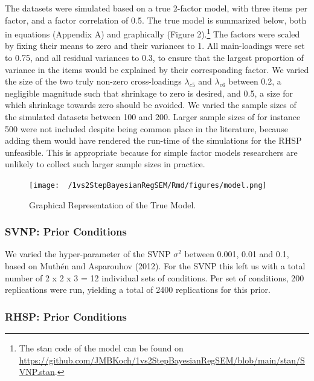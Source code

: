 \documentclass[
  man, donotrepeattitle,floatsintext]{apa6}
\begin{document}
The datasets were simulated based on a true 2-factor model, with three items per factor, and a factor correlation of 0.5. The true model is summarized below, both in equations (Appendix A) and graphically (Figure 2).\footnote{The stan code of the model can be found on \url{https://github.com/JMBKoch/1vs2StepBayesianRegSEM/blob/main/stan/SVNP.stan}.} The factors were scaled by fixing their means to zero and their variances to 1. All main-loadings were set to 0.75, and all residual variances to 0.3, to ensure that the largest proportion of variance in the items would be explained by their corresponding factor. We varied the size of the two truly non-zero cross-loadings \(\lambda_{c 5}\) and \(\lambda_{c 6}\) between 0.2, a negligible magnitude such that shrinkage to zero is desired, and 0.5, a size for which shrinkage towards zero should be avoided. We varied the sample sizes of the simulated datasets between 100 and 200. Larger sample sizes of for instance 500 were not included despite being common place in the literature, because adding them would have rendered the run-time of the simulations for the RHSP unfeasible. This is appropriate because for simple factor models researchers are unlikely to collect such larger sample sizes in practice.

\begin{figure}
\centering
\texttt{[image: ~/1vs2StepBayesianRegSEM/Rmd/figures/model.png]}
\caption{Graphical Representation of the True Model.}
\end{figure}

\hypertarget{svnp-prior-conditions}{%
\subsubsection{SVNP: Prior Conditions}\label{svnp-prior-conditions}}

We varied the hyper-parameter of the SVNP \(\sigma^2\) between 0.001, 0.01 and 0.1, based on Muthén and Asparouhov (2012). For the SVNP this left us with a total number of 2 x 2 x 3 = 12 individual sets of conditions. Per set of conditions, 200 replications were run, yielding a total of 2400 replications for this prior.

\hypertarget{rhsp-prior-conditions}{%
\subsubsection{RHSP: Prior Conditions}\label{rhsp-prior-conditions}}
\end{document}
